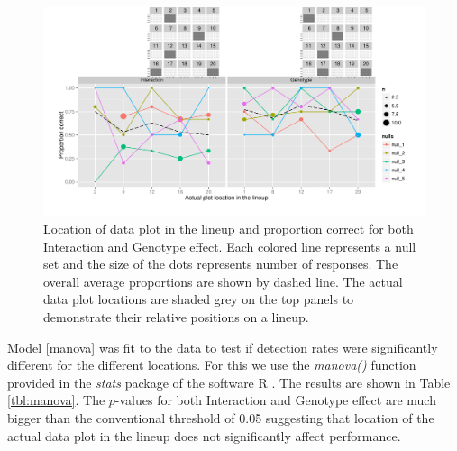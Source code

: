\documentclass[10pt]{article}\usepackage[]{graphicx}\usepackage[]{color}
\begin{document}
\begin{figure}[htbp] 
   \centering
    \includegraphics[width=6.5in]{proportion_nulls_guide.pdf} 
   \caption{Location of data plot in the lineup and proportion correct for both Interaction and Genotype effect. Each colored line represents a null set and the size of the dots represents number of responses. The overall average proportions are shown by dashed line. The actual data plot locations are shaded grey on the top panels to demonstrate their relative positions on a lineup.}
   \label{fig:location_effect}
\end{figure}



Model \eqref{manova} was fit to the data to test if  detection rates were significantly different for the different locations. For this we use the {\it manova()} function provided in the {\it stats} package of the software R \citep{R:2012}. The results are shown in Table \ref{tbl:manova}. The $p$-values for both Interaction and Genotype effect are much bigger than the conventional threshold of 0.05 suggesting that location of the actual data plot in the lineup does not significantly affect performance. 
\end{document}
